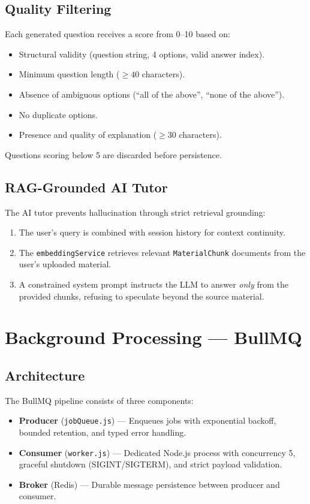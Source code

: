 \documentclass[12pt,a4paper]{article}
\begin{document}
\subsection{Quality Filtering}
Each generated question receives a score from 0--10 based on:
\begin{itemize}[leftmargin=1.5cm]
    \item Structural validity (question string, 4 options, valid answer index).
    \item Minimum question length ($\geq 40$ characters).
    \item Absence of ambiguous options (``all of the above'', ``none of the above'').
    \item No duplicate options.
    \item Presence and quality of explanation ($\geq 30$ characters).
\end{itemize}
Questions scoring below 5 are discarded before persistence.

\subsection{RAG-Grounded AI Tutor}
The AI tutor prevents hallucination through strict retrieval grounding:
\begin{enumerate}[leftmargin=1.5cm]
    \item The user's query is combined with session history for context continuity.
    \item The \texttt{embeddingService} retrieves relevant \texttt{MaterialChunk} documents from the user's uploaded material.
    \item A constrained system prompt instructs the LLM to answer \textit{only} from the provided chunks, refusing to speculate beyond the source material.
\end{enumerate}

\section{Background Processing --- BullMQ}

\subsection{Architecture}
The BullMQ pipeline consists of three components:
\begin{itemize}[leftmargin=1.5cm]
    \item \textbf{Producer} (\texttt{jobQueue.js}) --- Enqueues jobs with exponential backoff, bounded retention, and typed error handling.
    \item \textbf{Consumer} (\texttt{worker.js}) --- Dedicated Node.js process with concurrency 5, graceful shutdown (SIGINT/SIGTERM), and strict payload validation.
    \item \textbf{Broker} (Redis) --- Durable message persistence between producer and consumer.
\end{itemize}
\end{document}
